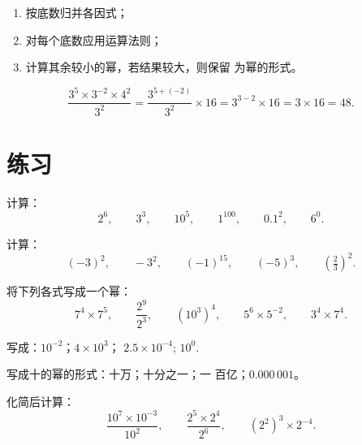 \begin{method}[化简含幂的表达式]\label{met:g8:powers:simplify}
\begin{enumerate}
  \item 按底数归并各因式；
  \item 对每个底数应用运算法则；
  \item 计算其余较小的幂，若结果较大，则保留
        为幂的形式。
\end{enumerate}
\end{method}

\begin{example}\label{ex:g8:powers:simplify}
\[
\frac{3^5 \times 3^{-2} \times 4^2}{3^2}
= \frac{3^{5 + (-2)}}{3^2} \times 16
= 3^{3 - 2} \times 16
= 3 \times 16 = 48 .
\]
\end{example}

\section{练习}

\begin{exercise}[$\star$]\label{exo:g8:powers:1}
计算：
\[
2^6, \qquad 3^3, \qquad 10^5, \qquad 1^{100}, \qquad 0.1^2, \qquad
6^0 .
\]
\end{exercise}

\begin{exercise}[$\star$]\label{exo:g8:powers:2}
计算：
\[
(-3)^2, \qquad -3^2, \qquad (-1)^{15}, \qquad (-5)^3, \qquad
\left(\tfrac{2}{3}\right)^2 .
\]
\end{exercise}

\begin{exercise}[$\star$]\label{exo:g8:powers:3}
将下列各式写成一个幂：
\[
7^4 \times 7^5, \qquad
\frac{2^9}{2^3}, \qquad
\left(10^3\right)^4, \qquad
5^6 \times 5^{-2}, \qquad
3^4 \times 7^4 .
\]
\end{exercise}

\begin{exercise}[$\star$]\label{exo:g8:powers:4}
写成：$10^{-2}$；\quad $4 \times 10^3$；\quad
$2.5 \times 10^{-4}$; \quad $10^0$.
\end{exercise}

\begin{exercise}[$\star$]\label{exo:g8:powers:5}
写成十的幂的形式：十万；十分之一；一
百亿；$0.000\,001$。
\end{exercise}

\begin{exercise}[$\star$]\label{exo:g8:powers:6}
化简后计算：
\[
\frac{10^7 \times 10^{-3}}{10^2},
\qquad
\frac{2^5 \times 2^4}{2^6},
\qquad
\left(2^2\right)^3 \times 2^{-4} .
\]
\end{exercise}

